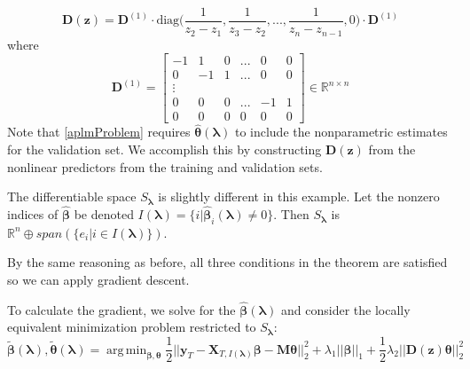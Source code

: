\documentclass[10pt,letterpaper]{article}
\DeclareMathOperator*{\argmin}{arg\,min}
\begin{document}
\begin{equation}
\boldsymbol{D}(\boldsymbol{z}) = \boldsymbol{D}^{(1)} \cdot
\text{diag} \big ( \frac{1}{z_{2} - z_1}, \frac{1}{z_{3} - z_2}, ... , \frac{1}{z_{n} - z_{n-1}}, 0 \big )
\cdot \boldsymbol{D}^{(1)}
\end{equation}
where
\begin{equation}
\boldsymbol{D}^{(1)} = 
\begin{bmatrix}
-1 & 1 & 0 & ... & 0 & 0 \\
0 & -1 & 1 & ... & 0 & 0 \\
\vdots \\
0 & 0 & 0 & ... & -1 & 1 \\
0 &0 & 0 &  0  &  0 & 0
\end{bmatrix}
\in
\mathbb{R}^{n\times n}
\end{equation}
Note that \eqref{aplmProblem} requires $\hat{\boldsymbol{\theta}}(\boldsymbol{\lambda})$ to include the nonparametric estimates for the validation set. We accomplish this by constructing $\boldsymbol{D}(\boldsymbol{z})$ from the nonlinear predictors from the training and validation sets.

The differentiable space $S_{\boldsymbol{\lambda}}$ is slightly different in this example. Let the nonzero indices of $\hat{\boldsymbol{\beta}}$ be denoted $I(\boldsymbol\lambda) = \{i | \hat{\boldsymbol{\beta}}_i(\boldsymbol\lambda) \ne 0\}$. Then $S_{\boldsymbol{\lambda}}$ is $\mathbb{R}^n \oplus span(\{e_i | i \in I(\boldsymbol\lambda)\})$.

By the same reasoning as before, all three conditions in the theorem are satisfied so we can apply gradient descent.

To calculate the gradient, we solve for the $\hat{\boldsymbol{\beta}}(\boldsymbol{\lambda})$ and consider the locally equivalent minimization problem restricted to $S_{\boldsymbol{\lambda}}$:
\begin{equation}
\tilde{\boldsymbol{\beta}}(\boldsymbol{\lambda}),
\tilde{\boldsymbol{\theta}}(\boldsymbol{\lambda}) =
\argmin_{\boldsymbol\beta, \boldsymbol{\theta}}
\frac{1}{2} \bigl\lvert\bigl\lvert
\boldsymbol{y}_T
- \boldsymbol{X}_{T, I(\boldsymbol \lambda)}\boldsymbol{\beta}
- \boldsymbol{M} \boldsymbol{\theta} \bigl\rvert\bigl\rvert^2_2
+ \lambda_1 \lvert\lvert \boldsymbol{\beta}
\rvert \rvert_1
+ \frac{1}{2} \lambda_2 \lvert\lvert \boldsymbol{D}(\boldsymbol{z}) \boldsymbol{\theta} \rvert \rvert_2^2
\end{equation}
\end{document}
